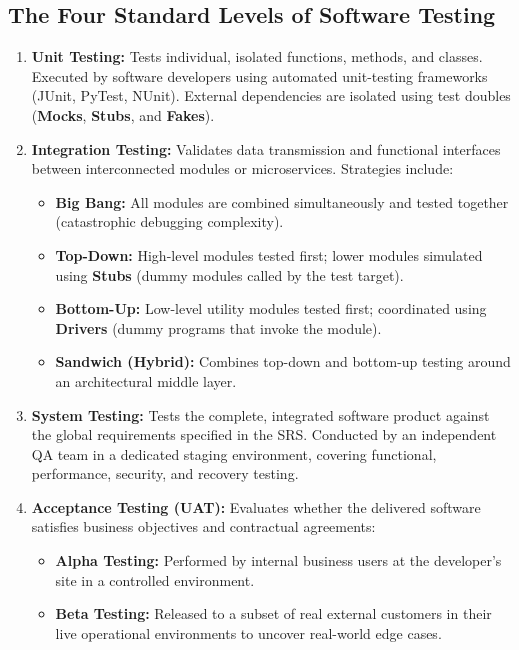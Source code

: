 \subsection{The Four Standard Levels of Software Testing}
\begin{enumerate}
    \item \textbf{Unit Testing:} Tests individual, isolated functions, methods, and classes. Executed by software developers using automated unit-testing frameworks (JUnit, PyTest, NUnit). External dependencies are isolated using test doubles (\textbf{Mocks}, \textbf{Stubs}, and \textbf{Fakes}).
    \item \textbf{Integration Testing:} Validates data transmission and functional interfaces between interconnected modules or microservices. Strategies include:
    \begin{itemize}
        \item \textbf{Big Bang:} All modules are combined simultaneously and tested together (catastrophic debugging complexity).
        \item \textbf{Top-Down:} High-level modules tested first; lower modules simulated using \textbf{Stubs} (dummy modules called by the test target).
        \item \textbf{Bottom-Up:} Low-level utility modules tested first; coordinated using \textbf{Drivers} (dummy programs that invoke the module).
        \item \textbf{Sandwich (Hybrid):} Combines top-down and bottom-up testing around an architectural middle layer.
    \end{itemize}
    \item \textbf{System Testing:} Tests the complete, integrated software product against the global requirements specified in the SRS. Conducted by an independent QA team in a dedicated staging environment, covering functional, performance, security, and recovery testing.
    \item \textbf{Acceptance Testing (UAT):} Evaluates whether the delivered software satisfies business objectives and contractual agreements:
    \begin{itemize}
        \item \textbf{Alpha Testing:} Performed by internal business users at the developer's site in a controlled environment.
        \item \textbf{Beta Testing:} Released to a subset of real external customers in their live operational environments to uncover real-world edge cases.
    \end{itemize}
\end{enumerate}

